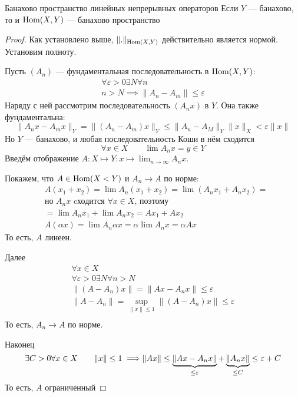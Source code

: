 \begin{thm}{Банахово пространство линейных непрерывных операторов}
  Если $Y$ --- банахово, то и $\mathrm{Hom}(X, Y)$ --- банахово пространство
\end{thm}
\begin{proof}
  Как установлено выше, $\|.\|_{\mathrm{Hom}(X,Y)}$ действительно является нормой.
  Установим полноту.
  \par{}
  Пусть $(A_n)$ --- фундаментальная последовательность в $\mathrm{Hom}(X,Y)$:
  \begin{align*}
    \forall\varepsilon>0 \exists N \forall n\\
    n>N \implies \|A_n - A_m\| \leq \varepsilon
  \end{align*}
  Наряду с ней рассмотрим последовательность $(A_n x)$ в $Y$.
  Она также фундаментальна:
  \begin{equation*}
    \|A_n x - A_m x\|_Y = \|(A_n - A_m) x\|_Y \leq \|A_n - A_M\|_Y\|x\|_X < \varepsilon\|x\|
  \end{equation*}
  Но $Y$ --- банахово, и любая последовательность Коши в нём сходится
  \begin{equation*}
    \forall x\in X \qquad \lim A_n x = y\in Y
  \end{equation*}
  Введём отображение
  $A:X\mapsto Y:x\mapsto\lim_{n\to\infty} A_n x$.

  \par{}
  Покажем, что $A\in\mathrm{Hom}(X<Y)$ и $A_n\to A$ по норме:
  \begin{align*}
    &A (x_1 + x_2) = \lim A_n (x_1 + x_2) = \lim (A_n x_1 + A_n x_2) = \\
    &\text{но } A_n x \text{ cходится } \forall x\in X \text{, поэтому } \\
    &= \lim A_n x_1 + \lim A_n x_2 = A x_1 + A x_2 \\
    &A (\alpha x) = \lim A_n \alpha x = \alpha \lim A_n x = \alpha A x
  \end{align*}
  То есть, $A$ линеен.

  Далее
  \begin{align*}
    & \forall x\in X &\\
    & \forall \varepsilon>0 \exists N \forall n>N \\
    & \|(A - A_n) x\| = \|A x - A_n x\| \leq \varepsilon \\
    & \|A - A_n\| = \sup_{\|x\|\leq 1} \|(A - A_n)x\| \leq \varepsilon \\
  \end{align*}
  То есть, $A_n\to A$ по норме.

  Наконец
  \begin{equation*}
    \exists C>0 \\
    \forall x\in X \qquad \|x\|\leq 1 \implies \\
    \|A x\| \leq
     \underbrace{\|A x - A_n x\|}_{\leq \varepsilon}
     + \underbrace{\|A_n x\|}_{\leq C} \leq \varepsilon+C
  \end{equation*}
  То есть, $A$ ограниченный
\end{proof}
